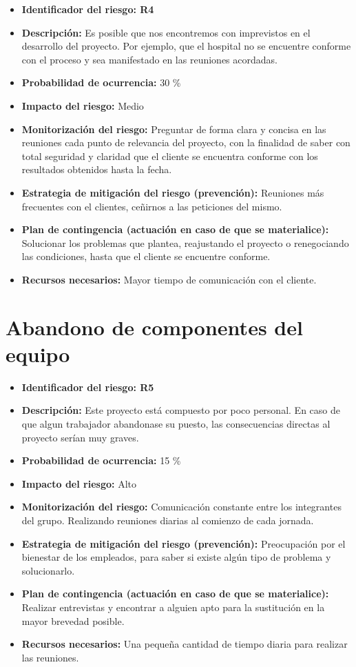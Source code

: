 \begin{itemize}
	\item \textbf{Identificador del riesgo: R4 }
	\item \textbf{Descripción: } Es posible que nos encontremos con imprevistos en el desarrollo del proyecto. Por ejemplo, que el hospital no se encuentre conforme con el proceso y sea manifestado en las reuniones acordadas. 
	\item \textbf{Probabilidad de ocurrencia: } 30 \%
	\item \textbf{Impacto del riesgo: } Medio 
	\item \textbf{Monitorización del riesgo: } Preguntar de forma clara y concisa en las reuniones cada punto de relevancia del proyecto, con la finalidad de saber con total seguridad y claridad que el cliente se encuentra conforme con los resultados obtenidos hasta la fecha.  
	\item \textbf{Estrategia de mitigación del riesgo (prevención): }  Reuniones más frecuentes con el clientes, ceñirnos a las peticiones del mismo.
	\item \textbf{Plan de contingencia (actuación en caso de que se materialice): } Solucionar los problemas que plantea, reajustando el proyecto o renegociando las condiciones, hasta que el cliente se encuentre conforme.
	\item \textbf{Recursos necesarios: } Mayor tiempo de comunicación con el cliente.
\end{itemize}

\section{Abandono de componentes del equipo}

\begin{itemize}
	\item \textbf{Identificador del riesgo: R5 }
	\item \textbf{Descripción: } Este proyecto está compuesto por poco personal. En caso de que algun trabajador abandonase su puesto, las consecuencias directas al proyecto serían muy graves.
	\item \textbf{Probabilidad de ocurrencia: } 15 \%
	\item \textbf{Impacto del riesgo: } Alto
	\item \textbf{Monitorización del riesgo: } Comunicación constante entre los integrantes del grupo. Realizando reuniones diarias al comienzo de cada jornada.   
	\item \textbf{Estrategia de mitigación del riesgo (prevención): } Preocupación por el bienestar de los empleados, para saber si existe algún tipo de problema y solucionarlo.   
	\item \textbf{Plan de contingencia (actuación en caso de que se materialice): } Realizar entrevistas y encontrar a alguien apto para la sustitución en la mayor brevedad posible.
	\item \textbf{Recursos necesarios: } Una pequeña cantidad de tiempo diaria para realizar las reuniones. 
\end{itemize}

